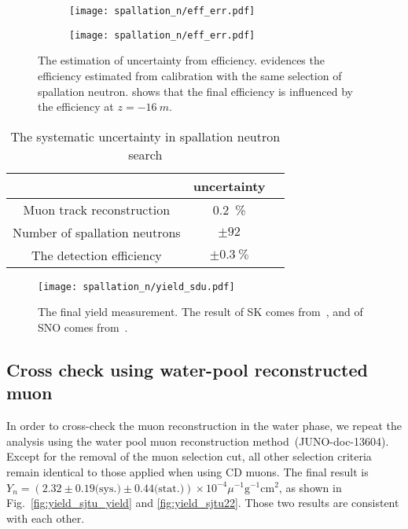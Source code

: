 \begin{figure}[h]
	\centering
	\begin{subfigure}{0.5\textwidth}
		\centering
		\texttt{[image: spallation\_n/eff\_err.pdf]}
		\caption{}
		\label{fig:SPNsourceCalib}
	\end{subfigure}%
	\begin{subfigure}{0.5\textwidth}
		\centering
		\texttt{[image: spallation\_n/eff\_err.pdf]}
		\caption{}
		\label{fig:muonEffUncerntainty}
	\end{subfigure}

	\caption{The estimation of uncertainty from efficiency.  evidences the efficiency estimated from  calibration with the same selection of spallation neutron.  shows that the final efficiency is influenced by the efficiency at $z=\SI{-16}{m}$.}
	\label{fig:muonEffUncer}
\end{figure}

\begin{table}[htbp]
	\caption{The systematic uncertainty in spallation neutron search}%
	\label{tab:spn_eff_un}
	\centering%
	\begin{tabular}{ccc}
		\toprule%
		                              & uncertainty       \\
		\midrule%
		Muon track reconstruction     & \SI{0.2}{\%}      \\
		Number of spallation neutrons & $\pm92$           \\
		The detection efficiency      & $\pm\SI{0.3}{\%}$ \\
		\bottomrule
	\end{tabular}
\end{table}

\begin{figure}[h]
	\centering
	\texttt{[image: spallation\_n/yield\_sdu.pdf]}
	\caption{The final yield measurement. The result of SK comes from~\cite{SK_spnYn}, and of SNO comes from~\cite{sno_spnYn}.}
	\label{fig:yield_final}
\end{figure}
\subsection{Cross check using water-pool reconstructed muon}
In order to cross-check the muon reconstruction in the water phase, we repeat the analysis using the water pool muon reconstruction method~(JUNO-doc-13604). Except for the removal of the muon selection cut, all other selection criteria remain identical to those applied when using CD muons. The final result is $Y_n =( 2.32\pm0.19\text{(sys.)}\pm0.44 \text{(stat.)}) \times 10^{-4}\mu^{-1}\text{g}^{-1}\text{cm}^2$, as shown in Fig.~\ref{fig:yield_sjtu_yield} and \ref{fig:yield_sjtu22}. Those two results are consistent with each other.


